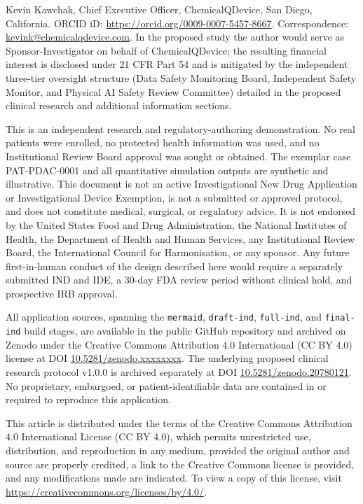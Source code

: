 Kevin Kawchak, Chief Executive Officer, ChemicalQDevice, San Diego, California.
ORCID iD:
\href{https://orcid.org/0009-0007-5457-8667}{https://orcid.org/0009-0007-5457-8667}.
Correspondence: \href{mailto:kevink@chemicalqdevice.com}{kevink@chemicalqdevice.com}.
In the proposed study the author would serve as Sponsor-Investigator on behalf of
ChemicalQDevice; the resulting financial interest is disclosed under 21 CFR Part 54
and is mitigated by the independent three-tier oversight structure (Data Safety
Monitoring Board, Independent Safety Monitor, and Physical AI Safety Review
Committee) detailed in the proposed clinical research and additional information
sections.

This is an independent research and regulatory-authoring demonstration. No real
patients were enrolled, no protected health information was used, and no
Institutional Review Board approval was sought or obtained. The exemplar case
PAT-PDAC-0001 and all quantitative simulation outputs are synthetic and
illustrative. This document is not an active Investigational New Drug Application or
Investigational Device Exemption, is not a submitted or approved protocol, and does
not constitute medical, surgical, or regulatory advice. It is not endorsed by the
United States Food and Drug Administration, the National Institutes of Health, the
Department of Health and Human Services, any Institutional Review Board, the
International Council for Harmonisation, or any sponsor. Any future first-in-human
conduct of the design described here would require a separately submitted IND and
IDE, a 30-day FDA review period without clinical hold, and prospective IRB approval.

All application sources, spanning the \texttt{mermaid}, \texttt{draft-ind},
\texttt{full-ind}, and \texttt{final-ind} build stages, are available in the public
GitHub repository and archived on Zenodo under the Creative Commons Attribution 4.0
International (CC BY 4.0) license at DOI
\href{https://doi.org/10.5281/zenodo.xxxxxxxx}{10.5281/zenodo.xxxxxxxx}. The
underlying proposed clinical research protocol v1.0.0 is archived separately at DOI
\href{https://doi.org/10.5281/zenodo.20780121}{10.5281/zenodo.20780121}. No
proprietary, embargoed, or patient-identifiable data are contained in or required to
reproduce this application.

This article is distributed under the terms of the Creative Commons Attribution 4.0
International License (CC BY 4.0), which permits unrestricted use, distribution, and
reproduction in any medium, provided the original author and source are properly
credited, a link to the Creative Commons license is provided, and any modifications
made are indicated. To view a copy of this license, visit
\url{https://creativecommons.org/licenses/by/4.0/}.

